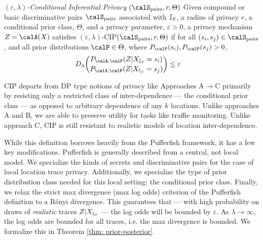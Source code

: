 
\begin{definition} \emph{ $(\varepsilon, \lambda)$-Conditional Inferential Privacy $(\Spairs, r, \Theta)$}
	Given compound or basic discriminative pairs $\Spairs$ associated with ${\mathbb{I}_S}$, a radius of privacy $r$, a conditional prior class, $\Theta$, and a privacy parameter, $\varepsilon > 0$, a privacy mechanism $Z = \calA(X)$ satisfies $(\varepsilon, \lambda)$-CIP$(\Spairs, r, \Theta)$ if for all $(s_i, s_j) \in \Spairs$, 
	and all prior distributions $\calP \in \Theta$, where $P_\calP(s_i), P_\calP(s_j) > 0$, 
	\begin{align}
		\label{eqn:CIP loss}
		D_\lambda \binom{P_{\calA, \calP} (Z | \Xs = s_i)}{P_{\calA, \calP} (Z | \Xs = s_j)} &\leq \varepsilon
	\end{align}
\end{definition}

CIP departs from DP type notions of privacy like Approaches A$\rightarrow$C primarily by resisting only a restricted class of inter-dependence --- the conditional prior class --- as opposed to arbitrary dependence of any $k$ locations. Unlike approaches A and B, we are able to preserve utility for tasks like traffic monitoring. Unlike approach C, CIP is still resistant to realistic models of location inter-dependence. 

While this definition borrows heavily from the Pufferfish framework, it has a few key modifications. Pufferfish is generally described from a central, not local model. We specialize the kinds of secrets and discriminative pairs for the case of local location trace privacy. Additionally, we specialize the type of prior distribution class needed for this local setting: the conditional prior class. Finally, we relax the strict max divergence (max log odds) criterion of the Pufferfish definition to a R\'enyi divergence. This guarantees that --- with high probability on draws of \emph{realistic} traces $Z|{X_{\mathbb{I}_S}}$ --- the log odds will be bounded by $\varepsilon$. As $\lambda \rightarrow \infty$, the log odds are bounded for all traces, i.e. the max divergence is bounded. We formalize this in Theorem \ref{thm: prior-posterior}. 

